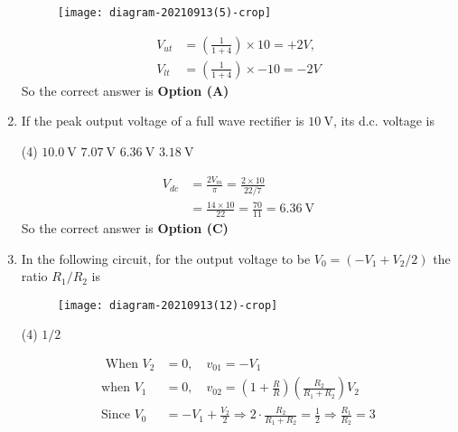 \begin{enumerate}
\begin{tasks}
\begin{figure}[H]
\end{figure}
\task[\textbf{D.}] \begin{figure}[H]
	\centering
	\texttt{[image: diagram-20210913(5)-crop]}
\end{figure}
\end{tasks}
\begin{answer}
\begin{align*}
V_{u t}&=\left(\frac{1}{1+4}\right) \times 10=+2 V, \\ V_{l t}&=\left(\frac{1}{1+4}\right) \times-10=-2 V
\end{align*}
So the correct answer is \textbf{Option (A)}
\end{answer}
	\item If the peak output voltage of a full wave rectifier is $10 \mathrm{~V}$, its d.c. voltage is
{	}
\begin{tasks}(4)
\task[\textbf{A.}] $10.0 \mathrm{~V}$
\task[\textbf{B.}] $7.07 \mathrm{~V}$
\task[\textbf{C.}] $6.36 \mathrm{~V}$
\task[\textbf{D.}] $3.18 \mathrm{~V}$
\end{tasks}
\begin{answer}
\begin{align*}
V_{d c}&=\frac{2 V_{m}}{\pi}=\frac{2 \times 10}{22 / 7}\\&=\frac{14 \times 10}{22}=\frac{70}{11}=6.36 \mathrm{~V}
\end{align*}
So the correct answer is \textbf{Option (C)}
\end{answer}
	\item In the following circuit, for the output voltage to be $V_{0}=\left(-V_{1}+V_{2} / 2\right)$ the ratio $R_{1} / R_{2}$ is
{	}
\begin{figure}[H]
\centering
\texttt{[image: diagram-20210913(12)-crop]}
\end{figure}
\begin{tasks}(4)
\task[\textbf{A.}] $1 / 2$
\end{tasks}
\begin{answer}
\begin{align*}
\text{	When }V_{2}&=0, \quad v_{01}=-V_{1}\\
\text{when }V_{1}&=0, \quad v_{02}=\left(1+\frac{R}{R}\right)\left(\frac{R_{2}}{R_{1}+R_{2}}\right) V_{2}\\
\text{Since }V_{0}&=-V_{1}+\frac{V_{2}}{2} \Rightarrow 2 \cdot \frac{R_{2}}{R_{1}+R_{2}}=\frac{1}{2} \Rightarrow \frac{R_{1}}{R_{2}}=3

\end{align*}
\end{answer}
\end{enumerate}
